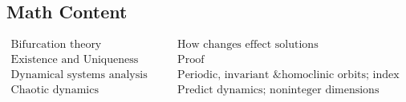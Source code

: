 \documentclass[main.tex]{subfiles}
\begin{document}
\subsection{Math Content}
\[
\begin{array}{lr}
    \textrm{Bifurcation theory} & \textrm{How changes effect solutions} \\
    \textrm{Existence and Uniqueness Theorem} & \textrm{Proof} \\
    \textrm{Dynamical systems analysis} & \textrm{Periodic, invariant \& homoclinic orbits; index theory} \\
    \textrm{Chaotic dynamics} & \textrm{Predict dynamics; noninteger dimensions} \end{array}\]
\end{document}
